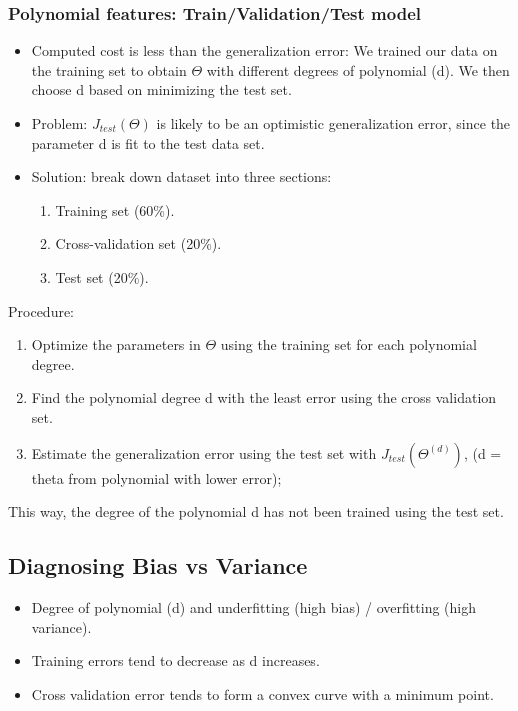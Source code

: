     \subsubsection{Polynomial features: Train/Validation/Test model}
        \begin{itemize}
            \item Computed cost is less than the generalization error: We trained our data on the training set to obtain $\Theta$ with different degrees of polynomial (d). We then choose d based on minimizing the test set.
            \item Problem: $J_{test} (\Theta)$ is likely to be an optimistic generalization error, since the parameter d is fit to the test data set.
            \item Solution: break down dataset into three sections:
                \begin{enumerate}
                    \item Training set (60\%).
                    \item Cross-validation set (20\%).
                    \item Test set (20\%).
                \end{enumerate}

        \end{itemize}

        Procedure:
        \begin{enumerate}
            \item Optimize the parameters in $\Theta$ using the training set for each polynomial degree.
            \item Find the polynomial degree d with the least error using the cross validation set.
            \item Estimate the generalization error using the test set with $J_{test}(\Theta^{(d)})$, (d = theta from polynomial with lower error);
        \end{enumerate}

        This way, the degree of the polynomial d has not been trained using the test set.
    

    
        
\subsection{Diagnosing Bias vs Variance}
    \begin{itemize}
        \item Degree of polynomial (d) and underfitting (high bias) / overfitting (high variance).
        \item Training errors tend to decrease as d increases. 
        \item Cross validation error tends to form a convex curve with a minimum point. 
    \end{itemize}

